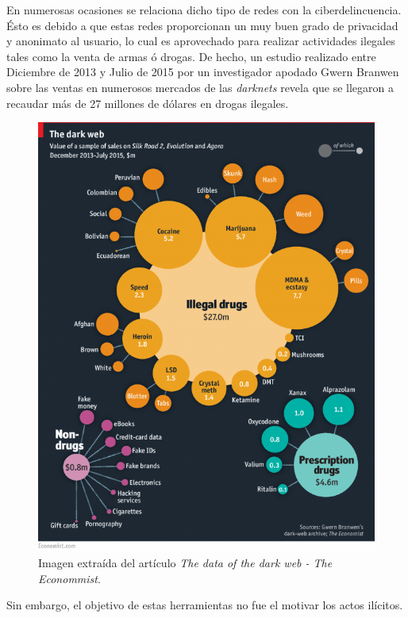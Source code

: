En numerosas ocasiones se relaciona dicho tipo de redes con la
ciberdelincuencia. Ésto es debido a que estas redes proporcionan un
muy buen grado de privacidad y anonimato al usuario, lo cual es
aprovechado para realizar actividades ilegales tales como la venta de
armas ó drogas.  De hecho, un estudio realizado entre Diciembre de
2013 y Julio de 2015 por un investigador apodado Gwern Branwen sobre
las ventas en numerosos mercados de las \textit{darknets} revela que
se llegaron a recaudar más de 27 millones de dólares en drogas
ilegales.

\begin{figure}[h]
	\centerline{
		\mbox{\includegraphics[width=5.00in]{images/darknet_markets.png}}
	}
	\caption{Imagen extraída del artículo \textit{The data of the dark web - The Econommist}.}
	\label{fig:norm_Daugman}
\end{figure}

Sin embargo, el objetivo de estas herramientas no fue el motivar los actos ilícitos. 

